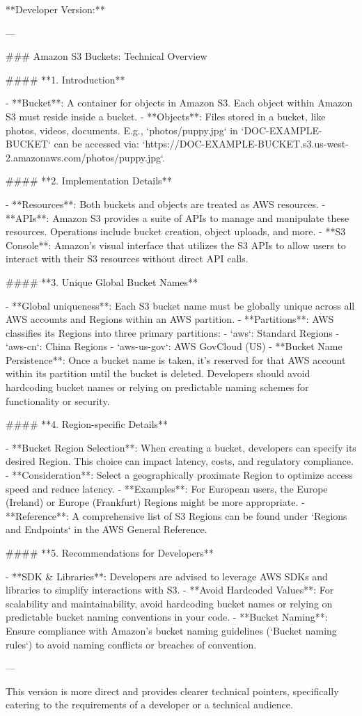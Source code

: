 **Developer Version:**

---

### Amazon S3 Buckets: Technical Overview

#### **1. Introduction**

- **Bucket**: A container for objects in Amazon S3. Each object within Amazon S3 must reside inside a bucket.
- **Objects**: Files stored in a bucket, like photos, videos, documents. E.g., `photos/puppy.jpg` in `DOC-EXAMPLE-BUCKET` can be accessed via: `https://DOC-EXAMPLE-BUCKET.s3.us-west-2.amazonaws.com/photos/puppy.jpg`.

#### **2. Implementation Details**

- **Resources**: Both buckets and objects are treated as AWS resources.
- **APIs**: Amazon S3 provides a suite of APIs to manage and manipulate these resources. Operations include bucket creation, object uploads, and more.
- **S3 Console**: Amazon's visual interface that utilizes the S3 APIs to allow users to interact with their S3 resources without direct API calls.

#### **3. Unique Global Bucket Names**

- **Global uniqueness**: Each S3 bucket name must be globally unique across all AWS accounts and Regions within an AWS partition. 
- **Partitions**: AWS classifies its Regions into three primary partitions:
    - `aws`: Standard Regions
    - `aws-cn`: China Regions
    - `aws-us-gov`: AWS GovCloud (US)
- **Bucket Name Persistence**: Once a bucket name is taken, it's reserved for that AWS account within its partition until the bucket is deleted. Developers should avoid hardcoding bucket names or relying on predictable naming schemes for functionality or security.

#### **4. Region-specific Details**

- **Bucket Region Selection**: When creating a bucket, developers can specify its desired Region. This choice can impact latency, costs, and regulatory compliance.
    - **Consideration**: Select a geographically proximate Region to optimize access speed and reduce latency. 
    - **Examples**: For European users, the Europe (Ireland) or Europe (Frankfurt) Regions might be more appropriate.
    - **Reference**: A comprehensive list of S3 Regions can be found under `Regions and Endpoints` in the AWS General Reference.

#### **5. Recommendations for Developers**

- **SDK & Libraries**: Developers are advised to leverage AWS SDKs and libraries to simplify interactions with S3.
- **Avoid Hardcoded Values**: For scalability and maintainability, avoid hardcoding bucket names or relying on predictable bucket naming conventions in your code.
- **Bucket Naming**: Ensure compliance with Amazon’s bucket naming guidelines (`Bucket naming rules`) to avoid naming conflicts or breaches of convention.

---

This version is more direct and provides clearer technical pointers, specifically catering to the requirements of a developer or a technical audience.